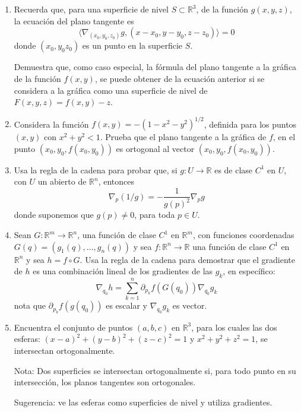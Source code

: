 \documentclass{article}
\theoremstyle{definition}
\begin{document}
\begin{enumerate}
  \item Recuerda que, para una superficie de nivel $S \subset \mathbb{R}^3$, de la funci\'on $g(x,y,z)$,
    la ecuaci\'on del plano tangente es
    $$
    \langle \nabla_{(x_0,y_0,z_0)}g, (x-x_0,y-y_0,z-z_0) \rangle =0
    $$
    donde $(x_0,y_0z_0)$ es un punto en la superficie $S$.

    Demuestra que, como caso especial, la f\'ormula del plano tangente a la gr\'afica de la funci\'on
    $f(x,y)$, se puede obtener de la ecuaci\'on anterior si se considera a la gr\'afica
    como una superficie de nivel de $F(x,y,z)=f(x,y)-z$.
 
    
  \item Considera la funci\'on $f(x,y)=-(1-x^2-y^2)^{1/2}$, definida para los puntos $(x,y)$
    con $x^2+y^2<1$. Prueba que el plano tangente a la gr\'afica de $f$, en el punto $(x_0,y_0,f(x_0,y_0))$
    es ortogonal al vector $(x_0,y_0,f(x_0,y_0))$.

    \item Usa la regla de la cadena para probar que, si $g:U\to \mathbb{R}$ es de clase
      $C^1$ en $U$, con $U$ un abierto de $\mathbb{R}^n$, entonces
      $$
      \nabla_{p}(1/g)=-\frac{1}{g(p)^2}\nabla_p g
      $$    
      donde suponemos que $g(p)\ne 0$, para toda $p\in U$.
    
  \item Sean $G:\mathbb{R}^m \to \mathbb{R}^n$, una funci\'on de clase $C^1$ en $\mathbb{R}^m$, con funciones
    coordenadas $G(q)=(g_1(q),\dots, g_n(q))$ y sea $f:\mathbb{R}^n \to \mathbb{R}$ una funci\'on
    de clase $C^1$ en $\mathbb{R}^n$ y sea $h=f\circ G$. Usa la regla de la cadena para demostrar que
    el gradiente de $h$ es una combinaci\'on lineal de los gradientes de las $g_k$, en espec\'ifico:
    $$
    \nabla_{q_0} h= \sum_{k=1}^n \partial_{p_k}f(G(q_0)) \nabla_{q_0}g_k
    $$
    nota que $\partial_{p_k}f(g(q_0))$ es escalar y $\nabla_{q_0}g_k$ es vector.


    \item Encuentra el conjunto de puntos $(a,b,c)$ en $\mathbb{R}^3$, para los cuales las
      dos esferas: $(x-a)^2+(y-b)^2+(z-c)^2=1$ y $x^2+y^2+z^2=1$, se intersectan ortogonalmente.

      Nota: Dos superficies se intersectan ortogonalmente si, para todo punto en su intersecci\'on,
      los planos tangentes son ortogonales. 

      Sugerencia: ve las esferas como superficies de nivel y utiliza gradientes. 


\end{enumerate}
\end{document}
